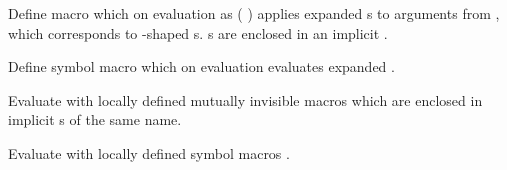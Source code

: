 \begin{LIST}{1cm}

  {
  Define macro  which on evaluation as (
  ) applies expanded s to arguments from
  , which corresponds to -shaped
  s. s are enclosed in an implicit
   .
  }

  {
  Define symbol macro  which on evaluation evaluates
  expanded . 
  }

  {
  Evaluate  with locally defined mutually
  invisible macros  which are enclosed in implicit s
  of the same name.
  }

  {
  Evaluate  with locally defined symbol macros
  . 
  }


\end{LIST}
